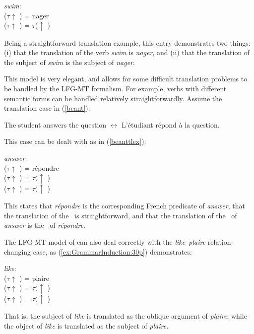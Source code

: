 \documentclass[output=paper,hidelinks]{langscibook}
\begin{document}
\ea
\label{tauswims}
{\em swim}: \\
($\tau\!\uparrow$ \PRED) = nager\\
($\tau\!\uparrow$ \SUBJ)  = $\tau(\uparrow$ \SUBJ)
\z

\noindent
Being a straightforward translation example, this entry demonstrates two things: (i) that the translation of the verb {\em swim} is {\em nager}, and (ii) that the translation of the subject of {\em swim} is the subject of {\em nager}.

This model is very elegant, and allows for some difficult translation problems to be handled by the LFG-MT formalism. For example, verbs with different semantic forms can be handled relatively straightforwardly. Assume the translation case in (\ref{beant}):

\ea
\label{beant}
The student answers the question $\longleftrightarrow$  L'\'{e}tudiant r\'{e}pond \`{a} la question.
\z

This case can be dealt with as in (\ref{beanttlex}):

\ea
\label{beanttlex}
{\em answer}: \\
($\tau\!\uparrow$ \PRED) = r\'{e}pondre\\
($\tau\!\uparrow$ \SUBJ)  = $\tau(\uparrow$ \SUBJ)\\
($\tau\!\uparrow$ \OBL\OBJ) = $\tau(\uparrow$ \OBJ)
\z

This states that {\em r\'{e}pondre} is the corresponding French
predicate of {\em answer}, that the translation of the \SUBJ\ is straightforward, and that 
the translation of the \OBJ\ of {\em answer} is the \OBL\OBJ\ of {\em r\'{e}pondre}.

The LFG-MT model of \citet{kaplanetal1989} can also deal correctly with the {\em like--plaire} relation-changing case, as (\ref{ex:GrammarInduction:30p}) demonstrates:  

\ea
\label{ex:GrammarInduction:30p}
{\em like}: \\
($\tau\!\uparrow$ \PRED) = plaire\\
($\tau\!\uparrow$ \OBLROLE) = $\tau(\uparrow$ \SUBJ)\\
($\tau\!\uparrow$ \SUBJ)  = $\tau(\uparrow$ \OBJ)
\z

That is, the subject of {\em like} is translated as the oblique
argument of {\em plaire}, while the object of {\em like} is translated
as the subject of {\em plaire}. 
\end{document}
